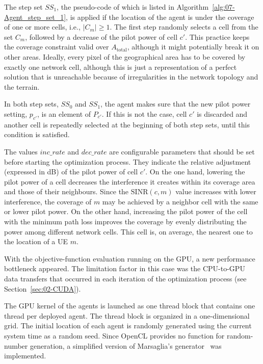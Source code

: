 The step set $SS_{1}$, the pseudo-code of which is listed in Algorithm~\ref{alg:07-Agent_step_set_1},
is applied if the location of the agent is under the coverage of one
or more cells, i.e., $\vert C_{m}\vert\ge1$. The first step randomly
selects a cell from the set $C_{m}$, followed by a decrease of the
pilot power of cell $c'$. This practice keeps the coverage constraint
valid over $A_{\mathrm{total}}$, although it might potentially break
it on other areas. Ideally, every pixel of the geographical area has
to be covered by exactly one network cell, although this is just a
representation of a perfect solution that is unreachable because of
irregularities in the network topology and the terrain.

In both step sets, $SS_{0}$ and $SS_{1}$, the agent makes sure that
the new pilot power setting, $p_{c'}$, is an element of $P_{c'}$.
If this is not the case, cell $c'$ is discarded and another cell
is repeatedly selected at the beginning of both step sets, until this
condition is satisfied.

The values $inc\_rate$ and $dec\_rate$ are configurable parameters
that should be set before starting the optimization process. They
indicate the relative adjustment (expressed in dB) of the pilot power
of cell $c'$. On the one hand, lowering the pilot power of a cell
decreases the interference it creates within its coverage area and
those of their neighbours. Since the $\mathrm{SINR}(c,m)$ value increases
with lower interference, the coverage of $m$ may be achieved by a
neighbor cell with the same or lower pilot power. On the other hand,
increasing the pilot power of the cell with the minimum path loss
improves the coverage by evenly distributing the power among different
network cells. This cell is, on average, the nearest one to the location
of a UE $m$.

\bigskip{}


With the objective-function evaluation running on the GPU, a new performance
bottleneck appeared. The limitation factor in this case was the CPU-to-GPU
data transfers that occurred in each iteration of the optimization
process (see Section~\ref{sec:02-CUDA}).

The GPU kernel of the agents is launched as one thread block that
contains one thread per deployed agent. The thread block is organized
in a one-dimensional grid. The initial location of each agent is randomly
generated using the current system time as a random seed. Since OpenCL
provides no function for random-number generation, a simplified version
of Marsaglia's generator~\cite{Marsaglia_Seeds.for.random.number.generator:2003}
was implemented.


